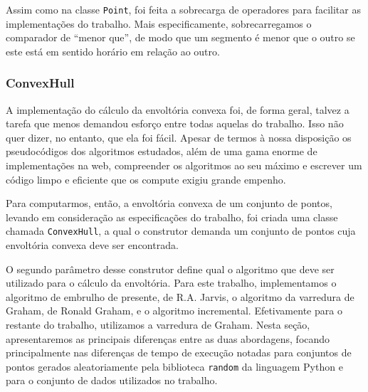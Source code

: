 \documentclass{article}
\begin{document}
Assim como na classe \texttt{Point}, foi feita a sobrecarga de operadores para facilitar as implementações do trabalho. Mais especificamente, sobrecarregamos o comparador de ``menor que'', de modo que um segmento é menor que o outro se este está em sentido horário em relação ao outro.

\subsubsection{ConvexHull}

A implementação do cálculo da envoltória convexa foi, de forma geral, talvez a tarefa que menos demandou esforço entre todas aquelas do trabalho. Isso não quer dizer, no entanto, que ela foi fácil. Apesar de termos à nossa disposição os pseudocódigos dos algoritmos estudados, além de uma gama enorme de implementações na web, compreender os algoritmos ao seu máximo e escrever um código limpo e eficiente que os compute exigiu grande empenho.

Para computarmos, então, a envoltória convexa de um conjunto de pontos, levando em consideração as especificações do trabalho, foi criada uma classe chamada \texttt{ConvexHull}, a qual o construtor demanda um conjunto de pontos cuja envoltória convexa deve ser encontrada.

O segundo parâmetro desse construtor define qual o algoritmo que deve ser utilizado para o cálculo da envoltória. Para este trabalho, implementamos o algoritmo de embrulho de presente, de R.A. Jarvis, o algoritmo da varredura de Graham, de Ronald Graham, e o algoritmo incremental. Efetivamente para o restante do trabalho, utilizamos a varredura de Graham. Nesta seção, apresentaremos as principais diferenças entre as duas abordagens, focando principalmente nas diferenças de tempo de execução notadas para conjuntos de pontos gerados aleatoriamente pela biblioteca \texttt{random} da linguagem Python e para o conjunto de dados utilizados no trabalho.
\end{document}
